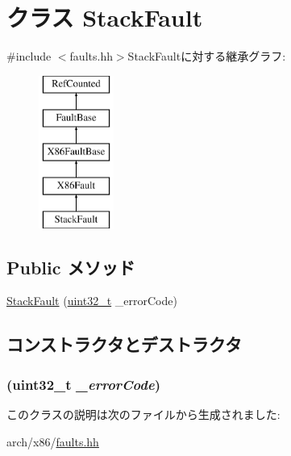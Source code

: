 \hypertarget{classX86ISA_1_1StackFault}{
\section{クラス StackFault}
\label{classX86ISA_1_1StackFault}
}


{\ttfamily \#include $<$faults.hh$>$}StackFaultに対する継承グラフ:\begin{figure}[H]
\begin{center}
\leavevmode
\includegraphics[height=5cm]{classX86ISA_1_1StackFault}
\end{center}
\end{figure}
\subsection*{Public メソッド}
\begin{DoxyCompactItemize}
\item 
\hyperlink{classX86ISA_1_1StackFault_ac2a5a32f38432bf0455a22f5ed642561}{StackFault} (\hyperlink{Type_8hh_a435d1572bf3f880d55459d9805097f62}{uint32\_\-t} \_\-errorCode)
\end{DoxyCompactItemize}


\subsection{コンストラクタとデストラクタ}
\hypertarget{classX86ISA_1_1StackFault_ac2a5a32f38432bf0455a22f5ed642561}{
\subsubsection[{StackFault}]{ ({\bf uint32\_\-t} {\em \_\-errorCode})}}
\label{classX86ISA_1_1StackFault_ac2a5a32f38432bf0455a22f5ed642561}



\begin{DoxyCode}
290                                         :
291             X86Fault("Stack", "#SS", 12, _errorCode)
292         {}
    };
\end{DoxyCode}


このクラスの説明は次のファイルから生成されました:\begin{DoxyCompactItemize}
\item 
arch/x86/\hyperlink{arch_2x86_2faults_8hh}{faults.hh}\end{DoxyCompactItemize}
